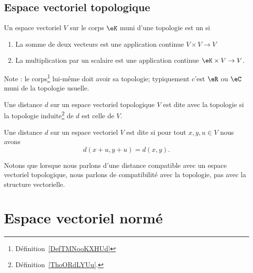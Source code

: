 \subsection{Espace vectoriel topologique}

\begin{definition}
    Un espace vectoriel \( V\) sur le corps \( \eK\) muni d'une topologie est un  si
    \begin{enumerate}
        \item
            La somme de deux vecteurs est une application continue \( V\times V\to V\)
        \item
            La multiplication par un scalaire est une application continue \( \eK\times V\to V\).
    \end{enumerate}
    Note : le corps\footnote{Définition~\ref{DefTMNooKXHUd}} lui-même doit avoir sa topologie; typiquement c'est \( \eR\) ou \( \eC\) muni de la topologie usuelle.
\end{definition}

\begin{definition}      \label{DEFooGTOZooRcvGHg}
    Une distance \( d\) sur un espace vectoriel topologique \( V\) est dite  avec la topologie si la topologie induite\footnote{Définition~\ref{ThoORdLYUu}.} de \( d\) est celle de \( V\).

    Une distance \( d\) sur un espace vectoriel \( V\) est dite  si pour tout \( x,y,u\in V\) nous avons
    \begin{equation}
        d(x+u,y+u)=d(x,y).
    \end{equation}
\end{definition}
Notons que lorsque nous parlons d'une distance compatible avec un espace vectoriel topologique, nous parlons de compatibilité avec la topologie, pas avec la structure vectorielle.

\section{Espace vectoriel normé}

